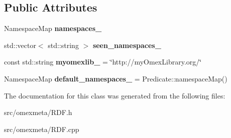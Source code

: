 \subsection*{Public Attributes}
\begin{DoxyCompactItemize}
\item 
\mbox{\label{classomexmeta_1_1RDF_a1979d7d70a4c20f2e63f00c7fa668b1f}} 
Namespace\+Map {\bfseries namespaces\+\_\+}
\item 
\mbox{\label{classomexmeta_1_1RDF_a82bc53feb93e1243970400fd104174da}} 
std\+::vector$<$ std\+::string $>$ {\bfseries seen\+\_\+namespaces\+\_\+}
\item 
\mbox{\label{classomexmeta_1_1RDF_aae58e1da72231c07cf0742f3321cebcc}} 
const std\+::string {\bfseries myomexlib\+\_\+} = \char`\"{}http\+://my\+Omex\+Library.\+org/\char`\"{}
\item 
\mbox{\label{classomexmeta_1_1RDF_a5b1184955f2401c30116c7473be1ca1d}} 
Namespace\+Map {\bfseries default\+\_\+namespaces\+\_\+} = Predicate\+::namespace\+Map()
\end{DoxyCompactItemize}


The documentation for this class was generated from the following files\+:\begin{DoxyCompactItemize}
\item 
src/omexmeta/R\+D\+F.\+h\item 
src/omexmeta/R\+D\+F.\+cpp\end{DoxyCompactItemize}
